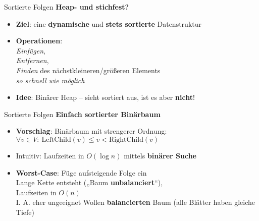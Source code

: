 \begin{frame}{Sortierte Folgen}
	\textbf{Heap- und stichfest?} 
	\begin{itemize}
		\item \textbf{Ziel}: eine \textbf{dynamische} und \textbf{stets sortierte} Datenstruktur
		\pause
		\item \textbf{Operationen}: \\ 
		\emph{Einfügen}, \\
		\emph{Entfernen}, \\
		\emph{Finden} des nächstkleineren/größeren Elements \\
		\impl \emph{so schnell wie möglich}
		\pause
		\item \textbf{Idee}: Binärer Heap – sieht sortiert aus, ist es aber \textbf{nicht}!
	\end{itemize}
\end{frame}

\begin{frame}{Sortierte Folgen}
	\textbf{Einfach sortierter Binärbaum} 
	\begin{itemize} 
		\item \textbf{Vorschlag}: Binärbaum mit strengerer Ordnung: \\
		$\forall v \in V : \ \text{LeftChild}(v) \leq v < \text{RightChild}(v)$
		\pause
		\item Intuitiv: Laufzeiten in $O(\log n)$ mittels \textbf{binärer Suche}
		\pause
		\item[\Cons] \textbf{Worst-Case}: Füge aufsteigende Folge ein \\
		\impl Lange Kette entsteht („Baum \textbf{unbalanciert}“), \\
		Laufzeiten in $O(n)$ \frownie \\
		\pause
		\impl I. A. eher ungeeignet
		\pause
		\implitem Wollen \textbf{balancierten} Baum (alle Blätter haben gleiche Tiefe) 
	\end{itemize}
\end{frame}

